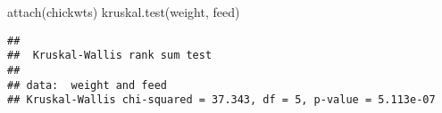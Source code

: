 \documentclass[
]{article}
\newenvironment{Shaded}{\begin{snugshade}}{\end{snugshade}}
\newcommand{\FunctionTok}[1]{\textcolor[rgb]{0.00,0.00,0.00}{#1}}
\newcommand{\NormalTok}[1]{#1}
\begin{document}
\begin{Shaded}
\begin{Highlighting}[]
\FunctionTok{attach}\NormalTok{(chickwts)}
\FunctionTok{kruskal.test}\NormalTok{(weight, feed)}
\end{Highlighting}
\end{Shaded}

\begin{verbatim}
## 
##  Kruskal-Wallis rank sum test
## 
## data:  weight and feed
## Kruskal-Wallis chi-squared = 37.343, df = 5, p-value = 5.113e-07
\end{verbatim}
\end{document}
